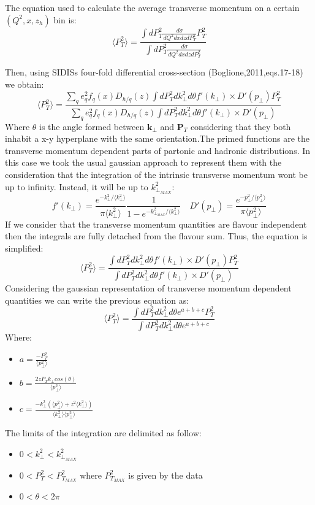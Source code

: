 \documentclass[8pt]{article}
\begin{document}
The equation used to calculate the average transverse momentum on a certain $(Q^2,x,z_h)$ bin is:
\begin{equation}
\langle P^2_T\rangle = \frac{\int dP^2_T \frac{d\sigma}{dQ^2dxdzdP^2_T} P^2_T}{\int dP^2_T \frac{d\sigma}{dQ^2dxdzdP^2_T}}
\end{equation}

Then, using SIDISs four-fold differential cross-section (Boglione,2011,eqs.17-18) we obtain:
\begin{equation}
\langle P^2_T\rangle = \frac{\sum_q e^2_q f_q(x)D_{h/q}(z) \int dP^2_Tdk^2_{\perp}d\theta f'(k_{\perp})\times D'(p_{\perp})P^2_T}{\sum_q e^2_q f_q(x)D_{h/q}(z) \int dP^2_Tdk^2_{\perp}d\theta f'(k_{\perp})\times D'(p_{\perp})}
\end{equation}
Where $\theta$ is the angle formed between $\textbf{k}_{\perp}$ and $\textbf{P}_T$ considering that they both inhabit a x-y hyperplane with the same orientation.The primed functions are the transverse momentum dependent parts of partonic and hadronic distributions. In this case we took the usual gaussian approach to represent them with the consideration that the integration of the intrinsic transverse momentum wont be up to infinity. Instead, it will be up to $k^2_{\perp_{MAX}}$:
\begin{equation}
f'(k_{\perp})=\frac{e^{-k^2_{\perp}/\langle k^2_{\perp}\rangle}}{\pi\langle k^2_{\perp}\rangle}\frac{1}{1-e^{-k^2_{\perp_{MAX}}/\langle k^2_{\perp}\rangle}} \quad D'(p_{\perp})=\frac{e^{-p^2_{\perp}/\langle p^2_{\perp}\rangle}}{\pi\langle p^2_{\perp}\rangle}
\end{equation}
If we consider that the transverse momentum quantities are flavour independent then the integrals are fully detached from the flavour sum. Thus, the equation is simplified:
\begin{equation}
\langle P^2_T\rangle = \frac{\int dP^2_Tdk^2_{\perp}d\theta f'(k_{\perp})\times D'(p_{\perp})P^2_T}{\int dP^2_Tdk^2_{\perp}d\theta f'(k_{\perp})\times D'(p_{\perp})}
\end{equation}
Considering the gaussian representation of transverse momentum dependent quantities we can write the previous equation as:
\begin{equation}
\langle P^2_T\rangle = \frac{\int dP^2_Tdk^2_{\perp}d\theta e^{a+b+c}P^2_T}{\int dP^2_Tdk^2_{\perp}d\theta e^{a+b+c}}
\end{equation}
Where:
\begin{itemize}
\item $a=\frac{-P^2_T}{\langle p^2_{\perp}\rangle}$
\item $b=\frac{2zP_Tk_{\perp}cos(\theta)}{\langle p^2_{\perp}\rangle}$
\item $c=\frac{-k^2_{\perp}(\langle p^2_{\perp}\rangle + z^2\langle k^2_{\perp}\rangle)}{\langle k^2_{\perp}\rangle\langle p^2_{\perp}\rangle}$
\end{itemize}
The limits of the integration are delimited as follow:
\begin{itemize}
\item $0<k^2_{\perp}<k^2_{\perp_{MAX}}$
\item $0<P^2_T<P^2_{T_{MAX}}$ where $P^2_{T_{MAX}}$ is given by the data
\item $0<\theta<2\pi$
\end{itemize}
\end{document}
